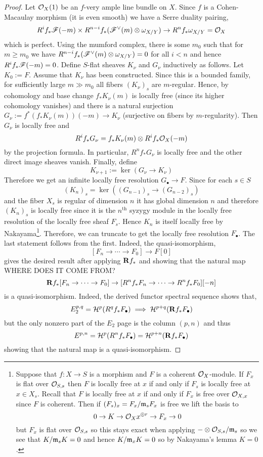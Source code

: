 \documentclass[12pt]{article}
\begin{document}
\begin{proof}
Let $\mathcal{O}_{X}(1)$ be an $f$-very ample line bundle on $X$. Since $f$ is a Cohen-Macaulay morphism (it is even smooth) we have a Serre duality pairing,
\[ R^i f_* \mathscr{F}(-m) \times R^{n-i} f_* (\mathscr{F}^\vee(m) \otimes \omega_{X/Y}) \to R^n f_* \omega_{X/Y} = \mathcal{O}_{X} \]
which is perfect. Using the mumford complex, there is some $m_0$ such that for $m \ge m_0$ we have $R^{n-i} f_* (\mathscr{F}^\vee(m) \otimes \omega_{X/Y}) = 0$ for all $i < n$ and hence $R^i f_* \mathscr{F}(-m) = 0$. Define $S$-flat sheaves $K_\nu$ and $G_\nu$ inductively as follows. Let $K_0 := F$. Assume that $K_\nu$ has been constructed. Since this is a bounded family, for sufficiently large $m \gg m_0$ all fibers $(K_\nu)_s$ are $m$-regular. Hence, by cohomology and base change $f_* K_\nu(m)$ is locally free (since its higher cohomology vanishes) and there is a natural surjection $G_\nu := f^* (f_* K_\nu(m))(-m) \to K_\nu$ (surjective on fibers by $m$-regularity). Then $G_\nu$ is locally free and
\[ R^i f_* G_\nu = f_* K_\nu(m) \otimes R^i f_* \mathcal{O}_{X}(-m) \]
by the projection formula. In particular, $R^n f_* G_\nu$ is locally free and the other direct image sheaves vanish. Finally, define
\[ K_{\nu + 1} := \ker{(G_\nu \to K_\nu)} \]
Therefore we get an infinite locally free resolution $G_\bullet \to F$. Since for each $s \in S$
\[ (K_n)_s = \ker{((G_{n-1})_s \to (G_{n-2})_s)} \]
and the fiber $X_s$ is regular of dimension $n$ it has global dimension $n$ and therefore $(K_n)_s$ is locally free since it is the $n^{\text{th}}$ syzygy module in the locally free resolution of the locally free sheaf $F_s$. Hence $K_n$ is itself locally free by Nakayama\footnote{Suppose that $f : X \to S$ is a morphism and $F$ is a coherent $\mathcal{O}_{X}$-module. If $F_x$ is flat over $\mathcal{O}_{S, s}$ then $F$ is locally free at $x$ if and only if $F_s$ is locally free at $x \in X_s$. Recall that $F$ is locally free at $x$ if and only if $F_x$ is free over $\mathcal{O}_{X, x}$ since $F$ is coherent. Then if $(F_s)_x = F_x / \mathfrak{m}_s F_x$ is free we lift the basis to
\[ 0 \to K \to \mathcal{O}_{X}{x}^{\oplus r} \to F_x \to 0 \]
but $F_x$ is flat over $\mathcal{O}_{S, s}$ so this stays exact when applying $- \otimes \mathcal{O}_{S, s}/\mathfrak{m}_s$ so we see that $K / \mathfrak{m}_s K = 0$ and hence $K / \mathfrak{m}_x K = 0$ so by Nakayama's lemma $K = 0$.}. Therefore, we can truncate to get the locally free resolution $F_\bullet$. The last statement follows from the first. Indeed, the quasi-isomorphism,
\[ [F_n \to \cdots \to F_0] \to F[0] \]
gives the desired result after applying $\mathbf{R} f_*$ and showing that the natural map {\color{red} WHERE DOES IT COME FROM?}
\[ \mathbf{R} f_* [F_n \to \cdots \to F_0] \to [R^n f_* F_n \to \cdots \to R^n f_* F_0][-n] \]
is a quasi-isomorphism. Indeed, the derived functor spectral sequence shows that,
\[ E^{p,q}_2 = \mathcal{H}^p(R^q f_* F_\bullet) \implies \mathcal{H}^{p+q}(\mathbf{R} f_* F_\bullet) \]
but the only nonzero part of the $E_2$ page is the column $(p, n)$ and thus
\[ E^{p,n} = \mathcal{H}^p(R^n f_* F_\bullet) = \mathcal{H}^{p+n}(\mathbf{R} f_* F_\bullet) \]
showing that the natural map is a quasi-isomorphism.
\end{proof}
\end{document}

